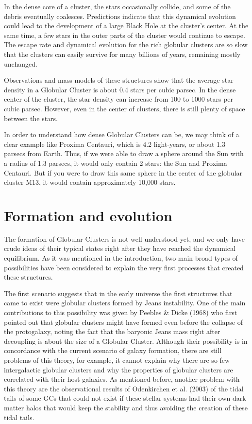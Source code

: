 In the dense core of a cluster, the stars occasionally collide, and some of the debris eventually coalesces. Predictions indicate that this dynamical evolution could lead to the development of a large Black Hole at the cluster's center. At the same time, a few stars in the outer parts of the cluster would continue to escape. The escape rate and dynamical evolution for the rich globular clusters are so slow that the clusters can easily survive for many billions of years, remaining mostly unchanged.

Observations and mass models of these structures show that the average star density in a Globular Cluster is about 0.4 stars per cubic parsec. In the dense center of the cluster, the star density can increase from 100 to 1000 stars per cubic parsec. However, even in the center of clusters, there is still plenty of space between the stars.

In order to understand how dense Globular Clusters can be, we may think of a clear example like Proxima Centauri, which is 4.2 light-years, or about 1.3 parsecs from Earth. Thus, if we were able to draw a sphere around the Sun with a radius of 1.3 parsecs, it would only contain 2 stars: the Sun and Proxima Centauri. But if you were to draw this same sphere in the center of the globular cluster M13, it would contain approximately 10,000 stars.

\section{Formation and evolution}

The formation of Globular Clusters is not well understood yet, and we only have crude ideas of their typical states right after they have reached the dynamical equilibrium. As it was mentioned in the introduction, two main broad types of possibilities have been considered to explain the very first processes that created these structures. 

The first scenario suggests that in the early universe the first structures that came to exist were globular clusters formed by Jeans instability. One of the main contributions to this possibility was given by Peebles \& Dicke (1968) \cite{7} who first pointed out that globular clusters might have formed even before the collapse of the protogalaxy, noting the fact that the baryonic Jeans mass right after decoupling is about the size of a Globular Cluster. Although their possibility is in concordance with the current scenario of galaxy formation, there are still problems of this theory, for example, it cannot explain why there are so few intergalactic globular clusters and why the properties of globular clusters are correlated with their host galaxies. As mentioned before, another problem with this theory are the observational results of Odenkirchen et al. (2003) \cite{12} of the tidal tails of some GCs that could not exist if these stellar systems had their own dark matter halos that would keep the stability and thus avoiding the creation of these tidal tails.

